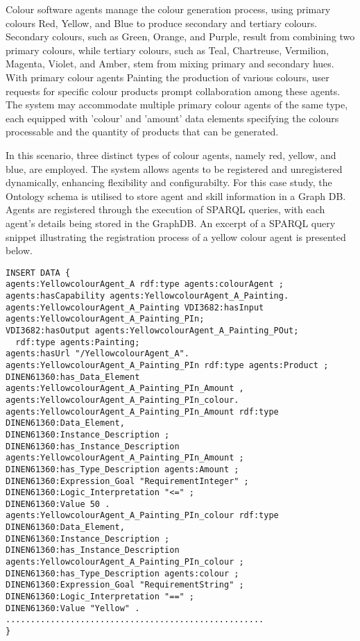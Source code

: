 \documentclass[conference]{IEEEtran}
\begin{document}
Colour software agents manage the colour generation process, using primary colours Red, Yellow, and Blue to produce secondary and tertiary colours. Secondary colours, such as Green, Orange, and Purple, result from combining two primary colours, while tertiary colours, such as Teal, Chartreuse, Vermilion, Magenta, Violet, and Amber, stem from mixing primary and secondary hues. With primary colour agents Painting the production of various colours, user requests for specific colour products prompt collaboration among these agents. The system may accommodate multiple primary colour agents of the same type, each equipped with 'colour' and 'amount' data elements specifying the colours processable and the quantity of products that can be generated.

In this scenario, three distinct types of colour agents, namely red, yellow, and blue, are employed. The system allows agents to be registered and unregistered dynamically, enhancing flexibility and configurabilty. For this case study, the Ontology schema \cite{aljosha_cap_skill_plug_play} is utilised to store agent and skill information in a Graph DB. Agents are registered through the execution of SPARQL queries, with each agent's details being stored in the GraphDB. An excerpt of a SPARQL query snippet illustrating the registration process of a yellow colour agent is presented below.


\begin{lstlisting}
INSERT DATA {
agents:YellowcolourAgent_A rdf:type agents:colourAgent ;
agents:hasCapability agents:YellowcolourAgent_A_Painting.
agents:YellowcolourAgent_A_Painting VDI3682:hasInput agents:YellowcolourAgent_A_Painting_PIn;
VDI3682:hasOutput agents:YellowcolourAgent_A_Painting_POut;
  rdf:type agents:Painting;
agents:hasUrl "/YellowcolourAgent_A".
agents:YellowcolourAgent_A_Painting_PIn rdf:type agents:Product ;
DINEN61360:has_Data_Element agents:YellowcolourAgent_A_Painting_PIn_Amount ,
agents:YellowcolourAgent_A_Painting_PIn_colour.
agents:YellowcolourAgent_A_Painting_PIn_Amount rdf:type DINEN61360:Data_Element,
DINEN61360:Instance_Description ;
DINEN61360:has_Instance_Description agents:YellowcolourAgent_A_Painting_PIn_Amount ;
DINEN61360:has_Type_Description agents:Amount ;
DINEN61360:Expression_Goal "RequirementInteger" ;
DINEN61360:Logic_Interpretation "<=" ;
DINEN61360:Value 50 .
agents:YellowcolourAgent_A_Painting_PIn_colour rdf:type DINEN61360:Data_Element,
DINEN61360:Instance_Description ;
DINEN61360:has_Instance_Description agents:YellowcolourAgent_A_Painting_PIn_colour ;
DINEN61360:has_Type_Description agents:colour ;
DINEN61360:Expression_Goal "RequirementString" ;
DINEN61360:Logic_Interpretation "==" ;
DINEN61360:Value "Yellow" .
....................................................
}
\end{lstlisting}
\end{document}
